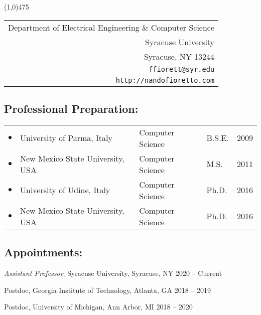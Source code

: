 \documentclass[times, 10pt]{article}
\newcommand{\belist}{\begin{list}{\labelitemi}{\itemsep 0.00em \parsep 0.00em \topsep 1.20em}}
\newcommand{\enlist}{\end{list}}
\begin{document}
\thispagestyle{empty}

\vspace*{-0.50in}  \line(1,0){475}

\begin{tabular}[t]{r}
\hspace{2.6in} 
Department of Electrical Engineering \& Computer Science \\
Syracuse University \\
Syracuse, NY 13244\\
\texttt{ffiorett@syr.edu} \\
\texttt{http://nandofioretto.com}
\end{tabular}

\subsection*{\sc Professional Preparation:}

\begin{tabular}{l l l l l }
$\bullet$ & University of Parma, Italy & Computer Science 
&\phantom{a}B.S.E. & {2009} \\ 
$\bullet$ & New Mexico State University, USA & Computer Science 
&\phantom{a}M.S. & {2011} \\ 
$\bullet$ & University of Udine, Italy & Computer Science 
&\phantom{a}Ph.D. & {2016} \\
$\bullet$ & New Mexico State University, USA & Computer Science 
&\phantom{a}Ph.D. & {2016} \\ 
\end{tabular}


\subsection*{\sc Appointments:}

\belist
	\item
	{\em Assistant Professor}, Syracuse University, Syracuse, NY \hfill{2020 -- Current}
	\item Postdoc, Georgia Institute of Technology, Atlanta, GA 
	\hfill{2018 -- 2019}
	\item Postdoc, University of Michigan, Ann Arbor, MI 
	\hfill{2018 -- 2020}	
\enlist
\end{document}
